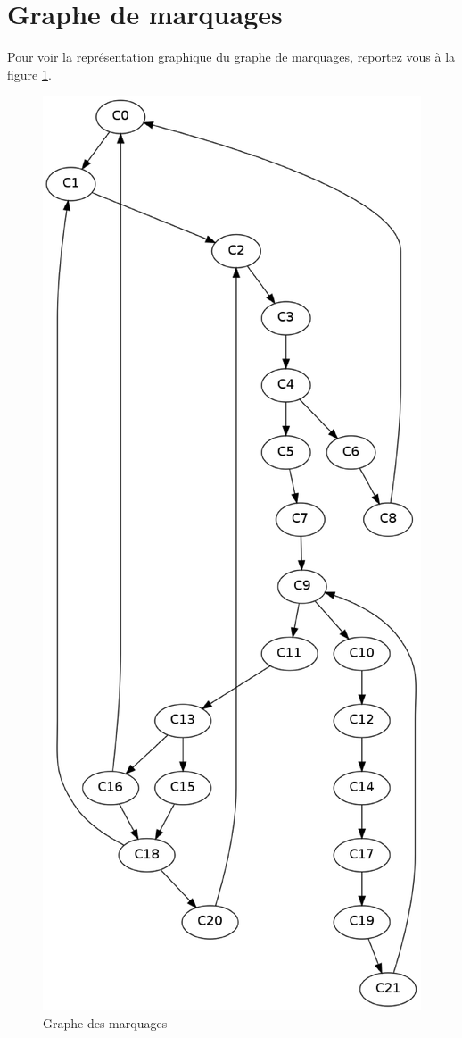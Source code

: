 \section{Graphe de marquages}
Pour voir la représentation graphique du graphe de marquages, reportez vous à la figure \ref{fig:marquages}.
 \begin{figure}[htb]
   \centering
   \includegraphics[scale = .3]{img/petri.eps}
   \caption{Graphe des marquages}
   \label{fig:marquages}
 \end{figure}

